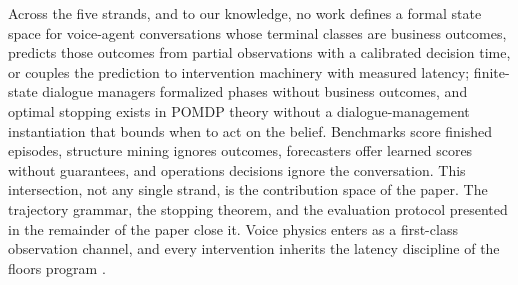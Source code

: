Across the five strands, and to our knowledge, no work defines a formal state space for
voice-agent conversations whose terminal classes are business outcomes, predicts those outcomes
from partial observations with a calibrated decision time, or couples the prediction to
intervention machinery with measured latency; finite-state dialogue managers formalized phases
without business outcomes, and optimal stopping exists in POMDP theory without a
dialogue-management instantiation that bounds when to act on the belief.
Benchmarks score finished episodes, structure mining ignores outcomes, forecasters offer learned scores without guarantees, and operations decisions ignore the conversation.
This intersection, not any single strand, is the contribution space of the paper.
The trajectory grammar, the stopping theorem, and the evaluation protocol presented in the remainder of the paper close it.
Voice physics enters as a first-class observation channel, and every intervention inherits the latency discipline of the floors program \citep{garcia2026latencyfloor}.
